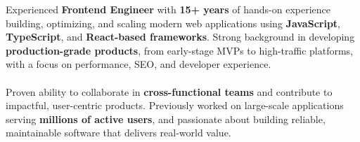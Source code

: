 
\begin{minipage}[t]{0.5\textwidth}
    \vspace{-6pt}

    Experienced \textbf{Frontend Engineer} with \textbf{15+ years} of hands-on experience building, optimizing, and scaling modern web applications using \textbf{JavaScript}, \textbf{TypeScript}, and \textbf{React-based frameworks}. Strong background in developing \textbf{production-grade products}, from early-stage MVPs to high-traffic platforms, with a focus on performance, SEO, and developer experience.
    \\
    \\
    Proven ability to collaborate in \textbf{cross-functional teams} and contribute to impactful, user-centric products. Previously worked on large-scale applications serving \textbf{millions of active users}, and passionate about building reliable, maintainable software that delivers real-world value.

\end{minipage}
\hfill %
